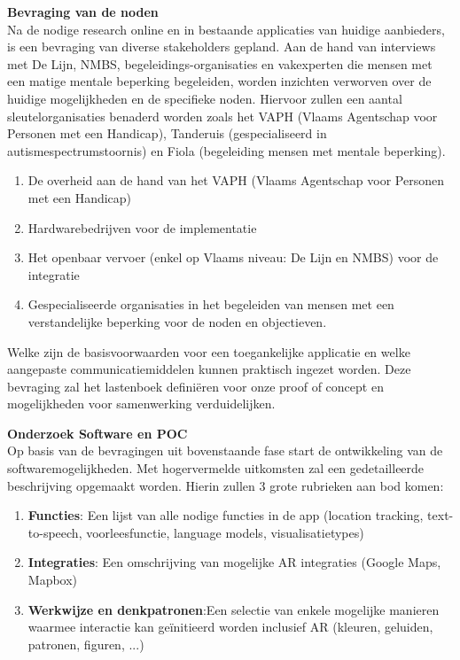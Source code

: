 \documentclass{hogent-article}
\begin{document}
    \textbf{Bevraging van de noden} \\
    
    Na de nodige research online en in bestaande applicaties van huidige aanbieders, is een bevraging van diverse stakeholders gepland. Aan de hand van interviews met De Lijn, NMBS, begeleidings-organisaties en vakexperten die mensen met een matige mentale beperking begeleiden, worden inzichten verworven over de huidige mogelijkheden en de specifieke noden. Hiervoor zullen een aantal sleutelorganisaties benaderd worden zoals het VAPH (Vlaams Agentschap voor Personen met een Handicap), Tanderuis (gespecialiseerd in autismespectrumstoornis) en Fiola (begeleiding mensen met mentale beperking).
    
    \begin{enumerate}
        \item De overheid aan de hand van het VAPH (Vlaams Agentschap voor Personen met een Handicap)
        \item Hardwarebedrijven voor de implementatie
        \item Het openbaar vervoer (enkel op Vlaams niveau: De Lijn en NMBS) voor de integratie
        \item Gespecialiseerde organisaties in het begeleiden van mensen met een verstandelijke beperking voor de noden en objectieven.
    \end{enumerate}

    Welke zijn de basisvoorwaarden voor een toegankelijke applicatie en welke aangepaste communicatiemiddelen kunnen praktisch ingezet worden. Deze bevraging zal het lastenboek definiëren voor onze proof of concept en mogelijkheden voor samenwerking verduidelijken. 
    
    \textbf{Onderzoek Software en POC} \\
    
    Op basis van de bevragingen uit bovenstaande fase start de ontwikkeling van de softwaremogelijkheden. Met hogervermelde uitkomsten zal een gedetailleerde beschrijving opgemaakt worden. Hierin zullen 3 grote rubrieken aan bod komen:
    
    \begin{enumerate}
        \item \textbf{Functies}: Een lijst van alle nodige functies in de app (location tracking, text-to-speech, voorleesfunctie, language models, visualisatietypes)
        \item \textbf{Integraties}: Een omschrijving van mogelijke AR integraties (Google Maps, Mapbox)
        \item \textbf{Werkwijze en denkpatronen}:Een selectie van enkele mogelijke manieren waarmee interactie kan geïnitieerd worden inclusief AR (kleuren, geluiden, patronen, figuren, ...)
    \end{enumerate}
\end{document}
